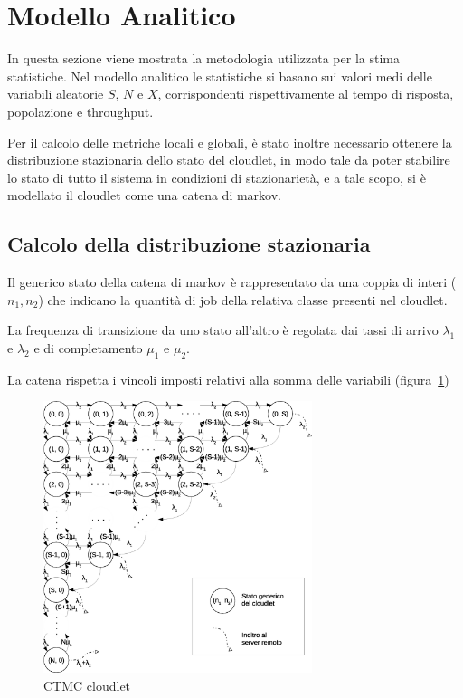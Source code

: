 \section{Modello Analitico}
In questa sezione viene mostrata la metodologia utilizzata per la stima statistiche.
Nel modello analitico le statistiche si basano sui valori medi delle variabili
aleatorie $S$, $N$ e $X$, corrispondenti rispettivamente al tempo di risposta,
popolazione e throughput.

Per il calcolo delle metriche locali e globali, è stato inoltre necessario
ottenere la distribuzione stazionaria dello stato del cloudlet, in modo tale da
poter stabilire lo stato di tutto il sistema in condizioni di stazionarietà, e a
tale scopo, si è modellato il cloudlet come una catena di markov.
%
\subsection{Calcolo della distribuzione stazionaria}
Il generico stato della catena di markov è rappresentato da una coppia di interi
($n_1, n_2$) che indicano la quantità di job della relativa classe presenti nel
cloudlet.  

La frequenza di transizione da uno stato all'altro è regolata dai tassi di
arrivo $\lambda_1$ e $\lambda_2$ e di completamento $\mu_1$ e $\mu_2$.

La catena rispetta i vincoli imposti relativi alla somma delle variabili
(figura~\ref{ctmc})
\begin{figure}[!h]
\centering
\includegraphics[width=0.7\textwidth]{figures/ctmc}
\caption{CTMC cloudlet}
\label{ctmc}
\end{figure}
